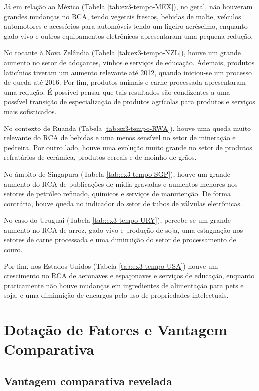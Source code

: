 Já em relação ao México (Tabela \ref{tab:ex3-tempo-MEX}), no geral, não houveram grandes mudanças no RCA, tendo vegetais frescos, bebidas de malte, veículos automotores e acessórios para automóveis tendo um ligeiro acréscimo, enquanto gado vivo e outros equipamentos eletrônicos apresentaram uma pequena redução.

No tocante à Nova Zelândia (Tabela \ref{tab:ex3-tempo-NZL}), houve um grande aumento no setor de adoçantes, vinhos e serviços de educação. Ademais, produtos laticínios tiveram um aumento relevante até 2012, quando iniciou-se um processo de queda até 2016. Por fim, produtos animais e carne processada apresentaram uma redução. É possível pensar que tais resultados são condizentes a uma possível transição de especialização de produtos agrícolas para produtos e serviços mais sofisticados.

No contexto de Ruanda (Tabela \ref{tab:ex3-tempo-RWA}), houve uma queda muito relevante do RCA de bebidas e uma menos sensível no setor de mineração e pedreira. Por outro lado, houve uma evolução muito grande no setor de produtos refratários de cerâmica, produtos cereais e de moinho de grãos.

No âmbito de Singapura (Tabela \ref{tab:ex3-tempo-SGP}), houve um grande aumento do RCA de publicações de mídia gravadas e aumentos menores nos setores de petróleo refinado, químicos e serviços de manutenção. De forma contrária, houve queda no indicador do setor de tubos de válvulas eletrônicas.

No caso do Uruguai (Tabela \ref{tab:ex3-tempo-URY}), percebe-se um grande aumento no RCA de arroz, gado vivo e produção de soja, uma estagnação nos setores de carne processada e uma diminuição do setor de processamento de couro. 

Por fim, nos Estados Unidos (Tabela \ref{tab:ex3-tempo-USA}) houve um crescimento no RCA de aeronaves e espaçonaves e serviços de educação, enquanto praticamente não houve mudanças em ingredientes de alimentação para pets e soja, e uma diminuição de encargos pelo uso de propriedades intelectuais. 

\clearpage
\section{Dotação de Fatores e Vantagem Comparativa}
\setcounter{subsection}{4}

\subsection{Vantagem comparativa revelada}

